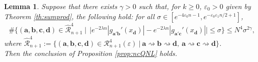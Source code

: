 \documentclass[a4paper]{article}
\newtheorem{lemma}[theorem]{Lemma}
\theoremstyle{definition}
\begin{document}
\begin{lemma}\label{lem:nc1}
Suppose that there exists $\gamma>0$ such that, for $k\geq 0$, $\varepsilon_0>0$ given by Theorem \ref{th:sumprod}, the following hold: for all $ \sigma \in [e^{-4\varepsilon_0 n-1}, e^{-\varepsilon_0 \varepsilon_1 n/2 +1}]$,
$$ \ \#\Big\{ (\mathbf{a},\mathbf{b},\mathbf{c},\mathbf{d}) \in \widehat{\mathcal{R}}_{n+1}^4 \ \Big| \  \ \big|e^{-2 \lambda n} |g_{\mathbf{a}'\mathbf{b}}'(x_{\mathbf{d}})| - e^{-2 \lambda n} |g_{\mathbf{a}'\mathbf{c}}'(x_{\mathbf{d}})|\big| \leq \sigma \Big\} \leq N^4 \sigma^{2 \gamma}, $$
where $\widehat{\mathcal{R}}_{n+1}^4 := \{ (\mathbf{a},\mathbf{b},\mathbf{c},\mathbf{d}) \in \mathcal{R}_{n+1}^4(\varepsilon) \ | \ \mathbf{a} \rightsquigarrow \mathbf{b} \rightsquigarrow \mathbf{d}, \ \mathbf{a} \rightsquigarrow \mathbf{c} \rightsquigarrow \mathbf{d}\}$.\\

Then the conclusion of Proposition \ref{prop:ncQNL} holds.
\end{lemma}
\end{document}
